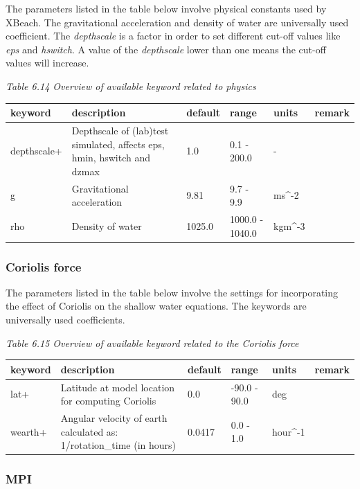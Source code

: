 \documentclass{article}
\begin{document}
\noindent The parameters listed in the table below involve physical constants used by XBeach. The gravitational acceleration and density of water are universally used coefficient. The \textit{depthscale} is a factor in order to set different cut-off values like \textit{eps} and \textit{hswitch}. A value of the \textit{depthscale} lower than one means the cut-off values will increase. 

\noindent \textit{Table 6.14 Overview of available keyword related to physics}

\begin{tabular}{|p{0.8in}|p{1.1in}|p{0.6in}|p{0.7in}|p{0.4in}|p{0.6in}|} \hline 
keyword & description & default & range & units & remark \\ \hline 
depthscale+ & Depthscale of (lab)test simulated, affects eps, hmin, hswitch and dzmax & 1.0 & 0.1 - 200.0 & - &  \\ \hline 
g & Gravitational acceleration & 9.81 & 9.7 - 9.9 & ms\^{}-2 &  \\ \hline 
rho & Density of water & 1025.0 & 1000.0 - 1040.0 & kgm\^{}-3 &  \\ \hline 
\end{tabular}


\subsubsection{ Coriolis force}

\noindent The parameters listed in the table below involve the settings for incorporating the effect of Coriolis on the shallow water equations. The keywords are universally used coefficients.

\noindent \textit{Table 6.15 Overview of available keyword related to the Coriolis force}

\begin{tabular}{|p{0.6in}|p{1.1in}|p{0.7in}|p{0.6in}|p{0.5in}|p{0.6in}|} \hline 
keyword & description & default & range & units & remark \\ \hline 
lat+ & Latitude at model location  for computing Coriolis & 0.0 & -90.0 - 90.0 & deg &  \\ \hline 
wearth+ & Angular velocity of earth calculated as: 1/rotation\_time (in hours) & 0.0417 & 0.0 - 1.0 & hour\^{}-1 &  \\ \hline 
\end{tabular}


\subsubsection{ MPI}
\end{document}

